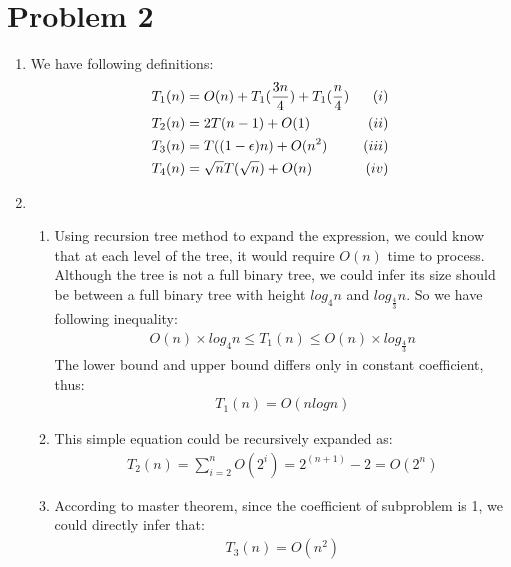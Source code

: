 \documentclass[paper=a4, fontsize=11pt]{scrartcl} %
\newcommand{\Rn}[1]{\uppercase\expandafter{\romannumeral #1\relax}}
\numberwithin{equation}{section} %
\numberwithin{figure}{section} %
\numberwithin{table}{section} %
\begin{document}
\section*{Problem 2}

\begin{enumerate}[label={2.(\alph*)}]
  \item We have following definitions:
    \begin{align*}
      & T_1(n) = O(n) + T_1(\frac{3n}{4}) + T_1(\frac{n}{4}) & (\Rn{1}) \\
      & T_2(n) = 2T(n-1) + O(1) & (\Rn{2}) \\
      & T_3(n) = T((1-\epsilon)n) + O(n^2) & (\Rn{3})  \\
      & T_4(n) = \sqrt{n}T(\sqrt{n}) + O(n) & (\Rn{4}) 
    \end{align*}

  \item 
    \begin{enumerate}[label={\roman*.}]
      \item Using recursion tree method to expand the expression, we could know
	that at each level of the tree, it would require $O(n)$ time to
	process. Although the tree is not a full binary tree, we could infer its size
	should be between a full binary tree with height $log_4n$ and
	$log_\frac{4}{3}n$. So we have following inequality:
	\begin{align*}
	  O(n) \times log_4n \leq T_1(n) \leq O(n) \times log_\frac{4}{3}n
	\end{align*}
	The lower bound and upper bound differs only in constant coefficient, thus:
	\begin{align*}
	  T_1(n)=O(n log n)
	\end{align*}

      \item This simple equation could be recursively expanded as:
	\begin{align*}
	  T_2(n) = \sum_{i=2}^{n} O(2^i) = 2^{(n+1)}-2 = O(2^n)
	\end{align*}

      \item According to master theorem, since the coefficient of subproblem is 1,
	we could directly infer that:
	\begin{align*}
	  T_3(n) = O(n^2)
	\end{align*}


\end{enumerate}
\end{enumerate}
\end{document}
